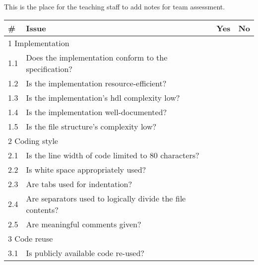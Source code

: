 \documentclass[%
	a4paper,
]
{article}
\begin{document}
This is the place for the teaching staff to add notes for team assessment.

\begin{table}[h!]
	\centering
	\renewcommand{\arraystretch}{2}
	\begin{tabular}{
		|p{.025\linewidth}
		|p{.75\linewidth}
		|p{.05\linewidth}
		|p{.05\linewidth}|
	}

		\hline
		\textbf{\#} & \textbf{Issue} & \textbf{Yes} & \textbf{No} \\
		\hline

		\multicolumn{4}{|p{.95\linewidth}|}{\cellcolor{gray!20} 1 Implementation}
			\\\hline

		1.1 & Does the implementation conform to the specification? & & \\\hline

		1.2 & Is the implementation resource-efficient? & & \\\hline

		1.3 & Is the implementation's \gls{hdl} complexity low? & & \\\hline

		1.4 & Is the implementation well-documented? & & \\\hline

		1.5 & Is the file structure's complexity low? & & \\\hline

		\multicolumn{4}{|p{.95\linewidth}|}{\cellcolor{gray!20} 2 Coding style}
			\\\hline

		2.1 & Is the line width of code limited to 80 characters?
			& & \\\hline

		2.2 & Is white space appropriately used? & & \\\hline

		2.3 & Are tabs used for indentation? & & \\\hline

		2.4 & Are separators used to logically divide the file contents? & & \\\hline

		2.5 & Are meaningful comments given? & & \\\hline

		\multicolumn{4}{|p{.95\linewidth}|}{\cellcolor{gray!20} 3 Code reuse} \\\hline

		3.1 & Is publicly available code re-used? & & \\\hline


\end{tabular}
\end{table}
\end{document}
